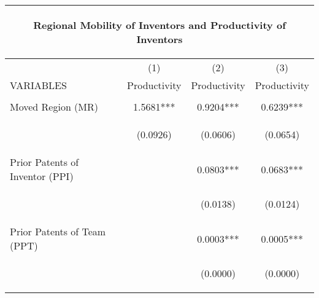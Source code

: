\begin{center}
\begin{tabular}{lccc}
\multicolumn{4}{c}{\begin{large}Regional Mobility of Inventors and Productivity of Inventors\end{large}} \\ \hline
 & (1) & (2) & (3) \\
VARIABLES & Productivity & Productivity & Productivity \\ \hline
\vspace{4pt} & \begin{footnotesize}\end{footnotesize} & \begin{footnotesize}\end{footnotesize} & \begin{footnotesize}\end{footnotesize} \\
Moved Region (MR) & 1.5681*** & 0.9204*** & 0.6239*** \\
\vspace{4pt} & \begin{footnotesize}(0.0926)\end{footnotesize} & \begin{footnotesize}(0.0606)\end{footnotesize} & \begin{footnotesize}(0.0654)\end{footnotesize} \\
Prior Patents of Inventor (PPI) &  & 0.0803*** & 0.0683*** \\
\vspace{4pt} & \begin{footnotesize}\end{footnotesize} & \begin{footnotesize}(0.0138)\end{footnotesize} & \begin{footnotesize}(0.0124)\end{footnotesize} \\
Prior Patents of Team (PPT) &  & 0.0003*** & 0.0005*** \\
\vspace{4pt} & \begin{footnotesize}\end{footnotesize} & \begin{footnotesize}(0.0000)\end{footnotesize} & \begin{footnotesize}(0.0000)\end{footnotesize} \\

\end{tabular}
\end{center}
